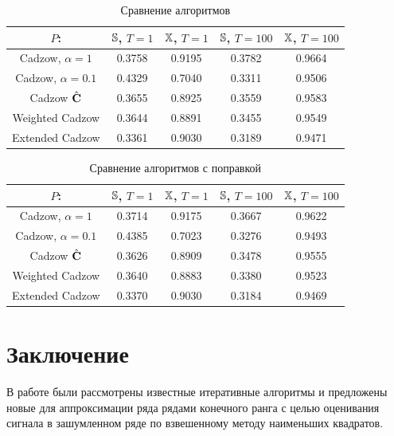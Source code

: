\documentclass[12pt,a4paper,fleqn,leqno]{article}
\begin{document}
\begin{table}[!hhh]
\begin{center}
\caption{Сравнение алгоритмов}\label{fintable}
\begin{tabular}{|c|c|c|c|c|}
\hline
$P$: & $\mathbb{S}$, $T = 1$ & $\mathbb{X}$, $T = 1$ & $\mathbb{S}$, $T = 100$ & $\mathbb{X}$, $T = 100$  \\
\hline
Cadzow, $\alpha = 1$ & 0.3758 & 0.9195 & 0.3782 & 0.9664 \\
\hline
Cadzow, $\alpha = 0.1$ & 0.4329 & 0.7040 & 0.3311 & 0.9506 \\
\hline
Cadzow $\hat{\mathbf{C}}$ & 0.3655 & 0.8925 & 0.3559 & 0.9583 \\
\hline
Weighted Cadzow & 0.3644 & 0.8891 & 0.3455 & 0.9549 \\
\hline
Extended Cadzow & 0.3361 & 0.9030 & 0.3189 & 0.9471 \\
\hline
\end{tabular}
\end{center}
\end{table}

\begin{table}[!hhh]
	\begin{center}
		\caption{Сравнение алгоритмов с поправкой}\label{fintable_improved}
		\begin{tabular}{|c|c|c|c|c|}
			\hline
			$P$: & $\mathbb{S}$, $T = 1$ & $\mathbb{X}$, $T = 1$ & $\mathbb{S}$, $T = 100$ & $\mathbb{X}$, $T = 100$  \\
			\hline
			Cadzow, $\alpha = 1$ & 0.3714 & 0.9175 & 0.3667 & 0.9622 \\
			\hline
			Cadzow, $\alpha = 0.1$ & 0.4385 & 0.7023 & 0.3276 & 0.9493 \\
			\hline
			Cadzow $\hat{\mathbf{C}}$ & 0.3626 & 0.8909 & 0.3478 & 0.9555 \\
			\hline
			Weighted Cadzow & 0.3640 & 0.8883 & 0.3380 & 0.9523 \\
			\hline
			Extended Cadzow & 0.3370 & 0.9030 & 0.3184 & 0.9469 \\
			\hline
		\end{tabular}
	\end{center}
\end{table}


\section{Заключение}
\label{sec:concl}
В работе были рассмотрены известные итеративные алгоритмы и предложены новые для аппроксимации ряда рядами конечного ранга с целью
оценивания сигнала в зашумленном ряде по взвешенному методу наименьших квадратов.
\end{document}
